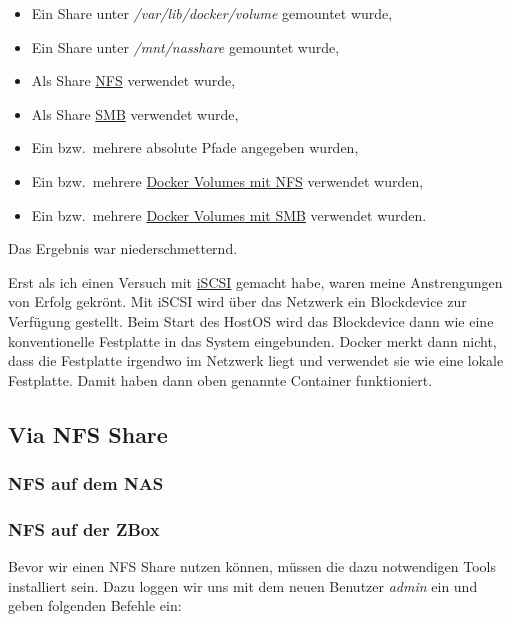 \documentclass[12pt,a4paper,ngerman]{article}
\newcommand{\code}[1]{\textit{#1}}
\begin{document}
\begin{itemize}
    \item Ein Share unter \code{/var/lib/docker/volume} gemountet wurde,
    \item Ein Share unter \code{/mnt/nasshare} gemountet wurde,
    \item Als Share \href{https://de.wikipedia.org/wiki/Network_File_System}{NFS} verwendet wurde,
    \item Als Share \href{https://de.wikipedia.org/wiki/Server_Message_Block}{SMB} verwendet wurde,
    \item Ein bzw.\ mehrere absolute Pfade angegeben wurden,
    \item Ein bzw.\ mehrere \href{https://nerdblog.steinkopf.net/2017/12/persistente-docker-volumes-mit-nfs-und-cifs/}{Docker Volumes mit NFS} verwendet wurden,
    \item Ein bzw.\ mehrere \href{https://nerdblog.steinkopf.net/2017/12/persistente-docker-volumes-mit-nfs-und-cifs/}{Docker Volumes mit SMB} verwendet wurden.
\end{itemize}

Das Ergebnis war niederschmetternd.

Erst als ich einen Versuch mit \href{https://de.wikipedia.org/wiki/ISCSI}{iSCSI}
gemacht habe, waren meine Anstrengungen von Erfolg gekrönt. Mit iSCSI wird über
das Netzwerk ein Blockdevice zur Verfügung gestellt. Beim Start des HostOS
wird das Blockdevice dann wie eine konventionelle Festplatte in das
System eingebunden. Docker merkt dann nicht, dass die Festplatte irgendwo im
Netzwerk liegt und verwendet sie wie eine lokale Festplatte. Damit haben dann
oben genannte Container funktioniert.

\subsection{Via NFS Share}

\subsubsection{NFS auf dem NAS}

\subsubsection{NFS auf der ZBox}
Bevor wir einen NFS Share nutzen können, müssen die dazu notwendigen Tools
installiert sein. Dazu loggen wir uns mit dem neuen Benutzer \code{admin} ein
und geben folgenden Befehle ein:
\end{document}
